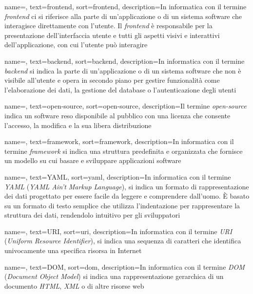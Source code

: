  {
    name=,
    text=frontend,
    sort=frontend,
    description={In informatica con il termine \emph{frontend} ci si riferisce alla parte di un'applicazione o di un sistema software che interagisce direttamente con l'utente. 
    Il \emph{frontend} è responsabile per la presentazione dell'interfaccia utente e tutti gli aspetti visivi e interattivi dell'applicazione, con cui l'utente può interagire}
}

 {
    name=,
    text=backend,
    sort=backend,
    description={In informatica con il termine \emph{backend} si indica la parte di un'applicazione o di un sistema software che non è visibile all'utente e opera in secondo piano per gestire funzionalità come l'elaborazione dei dati, la gestione del database o l'autenticazione degli utenti}
}

 {
    name=,
    text=open-source,
    sort=open-source,
    description={Il termine \emph{open-source} indica un software reso disponibile al pubblico con una licenza che consente l'accesso, la modifica e la sua libera distribuzione}
}

 {
    name=,
    text=framework,
    sort=framework,
    description={In informatica con il termine \emph{framework} si indica una struttura predefinita e organizzata che fornisce un modello su cui basare e sviluppare applicazioni software}
}

 {
    name=,
    text=YAML,
    sort=yaml,
    description={In informatica con il termine \emph{YAML} (\emph{YAML Ain't Markup Language}), si indica un formato di rappresentazione dei dati progettato per essere facile da leggere e comprendere dall'uomo. È basato su un formato di testo semplice che utilizza l'indentazione per rappresentare la struttura dei dati, rendendolo intuitivo per gli sviluppatori}
}

 {
    name=,
    text=URI,
    sort=uri,
    description={In informatica con il termine \emph{URI} (\emph{Uniform Resource Identifier}), si indica una sequenza di caratteri che identifica univocamente una specifica risorsa in Internet}
}

 {
    name=,
    text=DOM,
    sort=dom,
    description={In informatica con il termine \emph{DOM} (\emph{Document Object Model}) si indica una rappresentazione gerarchica di un documento \emph{HTML}, \emph{XML} o di altre risorse web}
}

